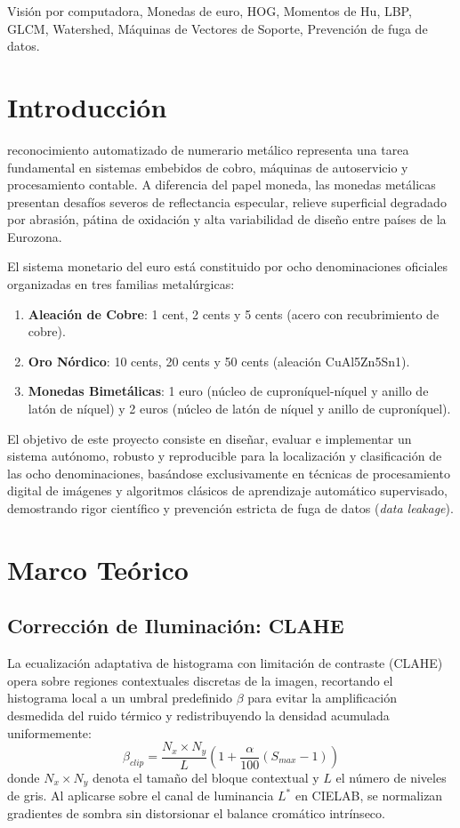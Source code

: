 \documentclass[journal,compsoc,twoside]{IEEEtran}
\begin{document}
\begin{IEEEkeywords}
Visión por computadora, Monedas de euro, HOG, Momentos de Hu, LBP, GLCM, Watershed, Máquinas de Vectores de Soporte, Prevención de fuga de datos.
\end{IEEEkeywords}

\section{Introducción}
 reconocimiento automatizado de numerario metálico representa una tarea fundamental en sistemas embebidos de cobro, máquinas de autoservicio y procesamiento contable. A diferencia del papel moneda, las monedas metálicas presentan desafíos severos de reflectancia especular, relieve superficial degradado por abrasión, pátina de oxidación y alta variabilidad de diseño entre países de la Eurozona.

El sistema monetario del euro está constituido por ocho denominaciones oficiales organizadas en tres familias metalúrgicas:
\begin{enumerate}
    \item \textbf{Aleación de Cobre}: 1 cent, 2 cents y 5 cents (acero con recubrimiento de cobre).
    \item \textbf{Oro Nórdico}: 10 cents, 20 cents y 50 cents (aleación CuAl5Zn5Sn1).
    \item \textbf{Monedas Bimetálicas}: 1 euro (núcleo de cuproníquel-níquel y anillo de latón de níquel) y 2 euros (núcleo de latón de níquel y anillo de cuproníquel).
\end{enumerate}

El objetivo de este proyecto consiste en diseñar, evaluar e implementar un sistema autónomo, robusto y reproducible para la localización y clasificación de las ocho denominaciones, basándose exclusivamente en técnicas de procesamiento digital de imágenes y algoritmos clásicos de aprendizaje automático supervisado, demostrando rigor científico y prevención estricta de fuga de datos (\textit{data leakage}).

\section{Marco Teórico}

\subsection{Corrección de Iluminación: CLAHE}
La ecualización adaptativa de histograma con limitación de contraste (CLAHE) opera sobre regiones contextuales discretas de la imagen, recortando el histograma local a un umbral predefinido $\beta$ para evitar la amplificación desmedida del ruido térmico y redistribuyendo la densidad acumulada uniformemente:
\begin{equation}
\beta_{clip} = \frac{N_{x} \times N_{y}}{L} \left(1 + \frac{\alpha}{100} (S_{max} - 1)\right)
\end{equation}
donde $N_x \times N_y$ denota el tamaño del bloque contextual y $L$ el número de niveles de gris. Al aplicarse sobre el canal de luminancia $L^*$ en CIELAB, se normalizan gradientes de sombra sin distorsionar el balance cromático intrínseco.
\end{document}
